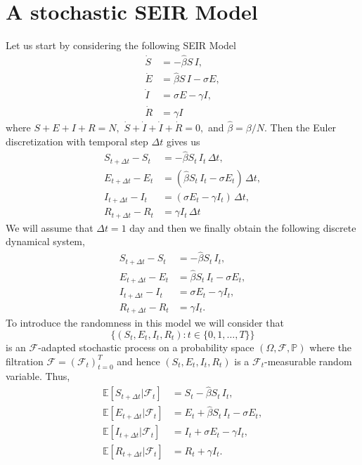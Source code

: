 \documentclass[12pt]{article}\usepackage[]{graphicx}\usepackage[]{color}
\begin{document}
\section{A stochastic SEIR Model}

Let us start by considering the following SEIR Model
\begin{align}
\dot{S} & = - \widehat{\beta} S \,I, \label{bPSEIR1}\\
\dot{E} & = \widehat{\beta} S \,I - \sigma E, \label{bPSEIR2} \\
\dot{I} & = \sigma E - \gamma I, \label{bPSEIR3}\\
\dot{R} & = \gamma I  \label{bPSEIR4}
\end{align}
where $S+E+I+R = N,$  $\dot{S}+\dot{I}+\dot{I}+\dot{R} =0,$ and $\widehat{\beta} = \beta/N.$ Then
the Euler discretization with temporal step $\Delta t$ gives us
\begin{align}
S_{t+\Delta t}-S_t & =  - \widehat{\beta} S_t \,I_t \, \Delta t, \label{cPSEIR1}\\
E_{t+\Delta t}-E_t & = (\widehat{\beta} S_t \,I_t - \sigma E_t)\, \Delta t, \label{cPSEIR2} \\
I_{t+\Delta t}-I_t & =  (\sigma E_t - \gamma I_t)\, \Delta t, \label{cPSEIR3} \\ 
R_{t+\Delta t}-R_t & = \gamma I_t \, \Delta t \label{cPSEIR4}
\end{align}
We will assume that $\Delta t = 1$ day and then we finally obtain the following discrete dynamical system,
\begin{align}
S_{t+\Delta t}-S_t & =  - \widehat{\beta} S_t \,I_t , \label{cPSEIR1}\\
E_{t+\Delta t}-E_t & = \widehat{\beta} S_t \,I_t - \sigma E_t, \label{cPSEIR2} \\
I_{t+\Delta t}-I_t & =  \sigma E_t - \gamma I_t, \label{cPSEIR3} \\ 
R_{t+\Delta t}-R_t & = \gamma I_t. \label{cPSEIR4}
\end{align}
To introduce the randomness in this model we will consider that
$$\{(S_t,E_t,I_t,R_t) : t \in \{0,1,\ldots,T\}\}$$ is an $\mathcal{F}$-adapted stochastic process on a probability
space $(\Omega,\mathcal{F},\mathbb{P})$ where the filtration $\mathcal{F}=(\mathcal{F}_t)_{t=0}^T$ and hence 
$(S_t,E_t,I_t,R_t)$ is a $\mathcal{F}_t$-measurable random variable. Thus,
\begin{align}
\mathbb{E}[S_{t+\Delta t}|\mathcal{F}_t] & =  S_t - \widehat{\beta} S_t \,I_t , \label{cPSEIR1}\\
\mathbb{E}[E_{t+\Delta t}|\mathcal{F}_t] & = E_t + \widehat{\beta} S_t \,I_t - \sigma E_t, \label{cPSEIR2} \\
\mathbb{E}[I_{t+\Delta t}|\mathcal{F}_t] & = I_t + \sigma E_t - \gamma I_t, \label{cPSEIR3} \\ 
\mathbb{E}[R_{t+\Delta t} |\mathcal{F}_t] & =R_t + \gamma I_t. \label{cPSEIR4}
\end{align}
\end{document}
